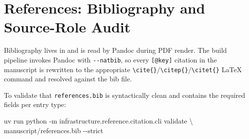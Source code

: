 \documentclass[
  english,
]{article}
\newenvironment{Shaded}{}{}
\newcommand{\AttributeTok}[1]{\textcolor[rgb]{0.49,0.56,0.16}{#1}}
\newcommand{\DataTypeTok}[1]{\textcolor[rgb]{0.56,0.13,0.00}{#1}}
\newcommand{\ExtensionTok}[1]{#1}
\newcommand{\NormalTok}[1]{#1}
\begin{document}
\newpage

\section{References: Bibliography and Source-Role
Audit}\label{sec:references}

Bibliography lives in
\href{references.bib}{} and is read by
Pandoc during PDF render. The build pipeline invokes Pandoc with
\texttt{-\/-natbib}, so every \texttt{{[}@key{]}} citation in the
manuscript is rewritten to the appropriate
\texttt{\textbackslash{}cite\{\}}/\texttt{\textbackslash{}citep\{\}}/\texttt{\textbackslash{}citet\{\}}
LaTeX command and resolved against the bib file.

To validate that \texttt{references.bib} is syntactically clean and
contains the required fields per entry type:

\begin{Shaded}
\begin{Highlighting}[]
\ExtensionTok{uv}\NormalTok{ run python }\AttributeTok{{-}m}\NormalTok{ infrastructure.reference.citation.cli validate }\DataTypeTok{\textbackslash{}}
\NormalTok{    manuscript/references.bib }\AttributeTok{{-}{-}strict}
\end{Highlighting}
\end{Shaded}




\providecommand{\bibsection}{}
\renewcommand{\bibsection}{}


\end{document}
